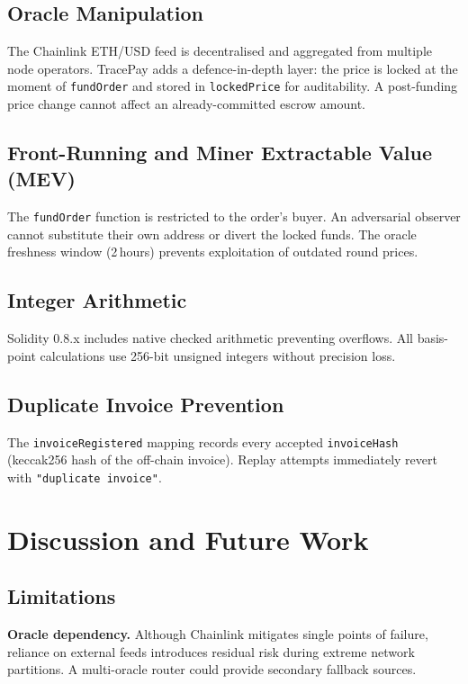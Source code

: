 \documentclass[conference]{IEEEtran}
\begin{document}
\subsection{Oracle Manipulation}

The Chainlink ETH/USD feed is decentralised and aggregated
from multiple node operators.
TracePay adds a defence-in-depth layer: the price is locked at the
moment of \texttt{fundOrder} and stored in \texttt{lockedPrice} for
auditability.
A post-funding price change cannot affect an already-committed escrow
amount.

\subsection{Front-Running and Miner Extractable Value (MEV)}

The \texttt{fundOrder} function is restricted to the order's
buyer.
An adversarial observer cannot substitute their own address or
divert the locked funds.
The oracle freshness window (2\,hours) prevents exploitation of
outdated round prices.

\subsection{Integer Arithmetic}

Solidity 0.8.x includes native checked arithmetic preventing overflows.
All basis-point calculations use 256-bit unsigned integers without
precision loss.

\subsection{Duplicate Invoice Prevention}

The \texttt{invoiceRegistered} mapping records every accepted
\texttt{invoiceHash} (keccak256 hash of the off-chain invoice).
Replay attempts immediately revert with \texttt{"duplicate invoice"}.

\section{Discussion and Future Work}
\label{sec:discussion}

\subsection{Limitations}

\textbf{Oracle dependency.}
Although Chainlink mitigates single points of failure, reliance on
external feeds introduces residual risk during extreme network partitions.
A multi-oracle router could provide secondary fallback sources.
\end{document}
